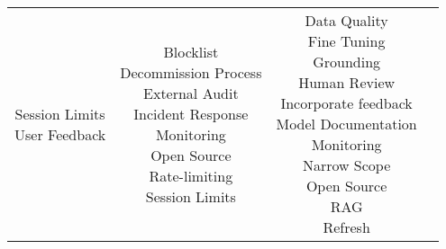 \documentclass[fleqn]{article}
\begin{document}
\begin{landscape}
\begin{table}[H]
\begin{tabular}{|c|c|c|c|}
{			\textbullet\hspace{3pt} Session Limits\\ 
			\textbullet\hspace{3pt} User Feedback\\ 		 	 	 
		}
		& \makecell[l]{
			\textbullet\hspace{3pt} Blocklist \\ 	
			\textbullet\hspace{3pt} Decommission Process\\ 	
			\textbullet\hspace{3pt} External Audit\\ 
			\textbullet\hspace{3pt} Incident Response\\  
			\textbullet\hspace{3pt} Monitoring\\ 	
			\textbullet\hspace{3pt} Open Source\\
			\textbullet\hspace{3pt} Rate-limiting \\ 
			\textbullet\hspace{3pt} Session Limits\\ 				 	 
		}
		& \makecell[l]{
			\textbullet\hspace{3pt} Data Quality\\ 
			\textbullet\hspace{3pt} Fine Tuning\\ 	
			\textbullet\hspace{3pt} Grounding\\ 	
			\textbullet\hspace{3pt} Human Review \\ 	
			\textbullet\hspace{3pt} Incorporate feedback \\
			\textbullet\hspace{3pt} Model Documentation \\ 	
			\textbullet\hspace{3pt} Monitoring\\ 	
			\textbullet\hspace{3pt} Narrow Scope\\ 	
			\textbullet\hspace{3pt} Open Source\\ 	
			\textbullet\hspace{3pt} RAG\\ 	
			\textbullet\hspace{3pt} Refresh\\ 
}
\end{tabular}
\end{table}
\end{landscape}
\end{document}
